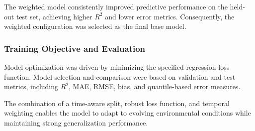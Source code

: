 The weighted model consistently improved predictive performance on the held-out test set, achieving higher $R^2$ and lower error metrics. Consequently, the weighted configuration was selected as the final base model.

\subsubsection*{Training Objective and Evaluation}
Model optimization was driven by minimizing the specified regression loss function. Model selection and comparison were based on validation and test metrics, including $R^2$, MAE, RMSE, bias, and quantile-based error measures.

The combination of a time-aware split, robust loss function, and temporal weighting enables the model to adapt to evolving environmental conditions while maintaining strong generalization performance.
